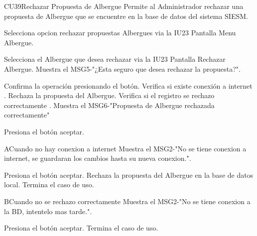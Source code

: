 \begin{UseCase}{CU39}{Rechazar Propuesta de Albergue}{
		Permite al Administrador rechazar una propuesta de Albergue que se encuentre en la base de datos del sistema SIESM.\\
}
	
\end{UseCase}



\begin{UCtrayectoria}
	\item\UCactor Selecciona opcion rechazar propuestas Albergues via la IU23 Pantalla Menu Albergue.
	\item\UCactor Selecciona el Albergue que desea rechazar via la IU23 Pantalla Rechazar Albergue.
	\UCpaso Muestra el MSG5-"¿Esta seguro que desea rechazar la propuesta?".
	\item\UCactor Confirma la operación presionando el botón.
	\UCpaso Verifica si existe conexión a internet .
	\UCpaso Rechaza la propuesta del Albergue.
	\UCpaso Verifica si el registro se rechazo correctamente .
	\UCpaso Muestra el MSG6-"Propuesta de Albergue rechazada correctamente"
	\item\UCactor Presiona el botón aceptar.
\end{UCtrayectoria}


\begin{UCtrayectoriaA}{A}{Cuando no hay conexion a internet}
	\UCpaso Muestra el MSG2-"No se tiene conexion a internet, se guardaran los cambios hasta su nueva conexion.".
	\item\UCactor Presiona el botón aceptar.
	\UCpaso Rechaza la propuesta del Albergue en la base de datos local.	
	\UCpaso[] Termina el caso de uso.
\end{UCtrayectoriaA}

\begin{UCtrayectoriaA}{B}{Cuando no se rechazo correctamente}
	\UCpaso Muestra el MSG2-"No se tiene conexion a la BD, intentelo mas tarde.".
	\item\UCactor Presiona el botón aceptar.
	\UCpaso[] Termina el caso de uso.
\end{UCtrayectoriaA}